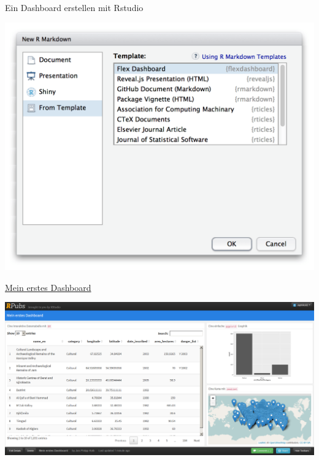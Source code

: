 \documentclass[ignorenonframetext,]{beamer}
\begin{document}
\begin{frame}{Ein Dashboard erstellen mit Rstudio}

\includegraphics{./tex2pdf.956/1d6c4b1dbda7c4e08d7718e5e92e2eed8ed2d9b3.png}

\end{frame}

\begin{frame}{\href{http://rpubs.com/Japhilko82/whcsites}{Mein erstes
Dashboard}}

\includegraphics{./tex2pdf.956/b2191ce44fa49a14ff7c1242a1c783d05d49f0d5.png}

\end{frame}
\end{document}
